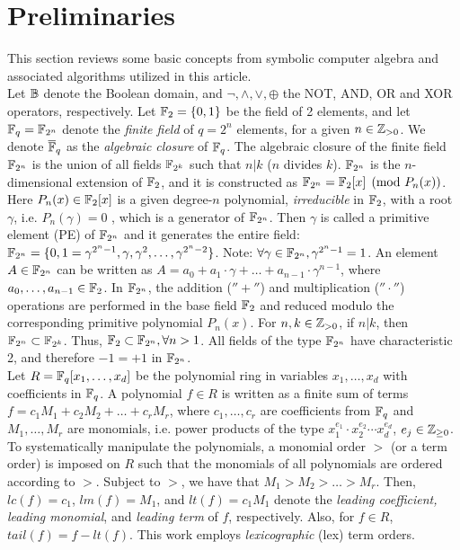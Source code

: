 \section{Preliminaries}
\label{sec:prelim}
This section reviews some basic concepts from symbolic computer
algebra and associated algorithms utilized in this article. \\

 Let ${\mathbb{B}}$ denote the Boolean domain, and $\neg,
\wedge,\vee, \oplus$ the NOT, AND, OR and XOR operators,
respectively. Let ${\mathbb{F}}_2=\{0,1\}$ be the field of 2 elements, and let
${\mathbb{F}}_q = {\mathbb{F}}_{2^n}$ denote the {\it finite field} of $q=2^n$ elements, for a
given $n\in {\mathbb{Z}}_{> 0}$. We denote $\overline{\mathbb{F}}_q$ as the {\it algebraic closure} of ${\mathbb{F}}_{q}$. 
The algebraic closure of the finite field ${\mathbb{F}}_{2^n}$ is the union of all fields ${\mathbb{F}}_{2^k}$
such that $n | k$ ($n$ divides $k$).
${\mathbb{F}}_{2^n}$ is the $n$-dimensional extension of
${\mathbb{F}}_2$, and it is constructed as ${\mathbb{F}}_{2^n} = {\mathbb{F}}_2[x]\pmod{ P_n(x)}$. Here
$P_n(x) \in {\mathbb{F}}_2[x]$ is a given degree-$n$ polynomial, {\it
  irreducible} in ${\mathbb{F}}_2$, with a root $\gamma$, i.e.  $P_n(\gamma)=0$ 
 , which is a generator of
${\mathbb{F}}_{2^n}$. Then $\gamma$ is called a primitive element (PE) of ${\mathbb{F}}_{2^n}$ and
it generates the entire field: ${\mathbb{F}}_{2^n}=\{0,1=\gamma^{2^n - 1}, \gamma,
\gamma^2,\dots,\gamma^{2^n - 2}\}$. Note: $\forall \gamma\in {\mathbb{F}}_{2^n}, 
\gamma^{2^n-1}=1$.
An element $A \in {\mathbb{F}}_{2^n}$ can be written as $A = a_0 + a_1\cdot \gamma +
\dots + a_{n-1}\cdot\gamma^{n-1}$, where $a_0,\dots,a_{n-1} \in
{\mathbb{F}}_2$. 
In ${\mathbb{F}}_{2^n}$, the addition ($''+''$) and multiplication
($''\cdot''$) operations are performed in the base field ${\mathbb{F}}_2$ and
reduced modulo the corresponding primitive polynomial $P_n(x)$. For
$n, k \in {\mathbb{Z}}_{> 0}$, if $n | k$, then ${\mathbb{F}}_{2^n} \subset
{\mathbb{F}}_{2^k}$.
Thus, ${\mathbb{F}}_2 \subset {\mathbb{F}}_{2^n}, \forall n>1$. 
All fields of the type
${\mathbb{F}}_{2^n}$ have characteristic 2, and therefore $-1 = +1$ in ${\mathbb{F}}_{2^n}$. \\


 Let $R={\mathbb{F}}_q[x_1,\dots,x_d]$ be the
polynomial ring in variables $x_1,\dots,x_d$ with coefficients in
${\mathbb{F}}_q$. A polynomial $f \in R$ is 
written as a finite sum of terms  $f = c_1 M_1 +  c_2 M_2 + \dots +
c_r M_r$, where $c_1, \dots, c_r$ are coefficients from ${\mathbb{F}}_q$ and
$M_1, \dots, M_r$ are monomials, i.e. power products of the type
$x_1^{e_{1}}\cdot x_2^{e_{2}}\cdots x_d^{e_{d}}$,  $e_j \in {\mathbb{Z}}_{\geq  0}$. 
 To systematically manipulate the polynomials, a monomial order $>$ (or
a term order) is imposed on $R$ such that the monomials of all
polynomials are ordered according to $>$. 
Subject to $>$, we have that $M_1 >M_2 > \dots > M_r$. Then, $lc(f) = c_1$, $lm(f) =
M_1$, and $lt(f) = c_1 M_1$ denote the {\it leading coefficient, leading monomial}, 
and {\it leading   term} of $f$, respectively. 
 Also, for $f\in R$, $tail(f) = f - lt(f)$.
This work employs {\it lexicographic} (lex) term orders.  \\

